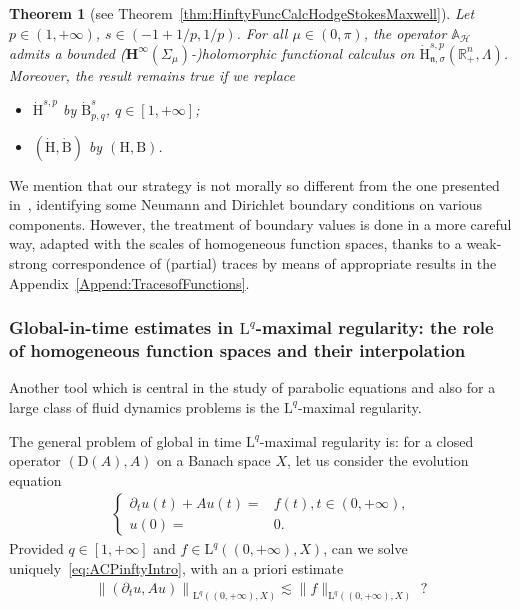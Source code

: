 \documentclass[10pt]{amsart}
\newtheorem{theo}{Theorem}[section]
\theoremstyle{definition}\newtheorem{defi}[theo]{Definition}\newtheorem{rema}[theo]{Remark}\newtheorem{exam}[theo]{Example}\newtheorem{exem}[theo]{Example}\newtheorem{nota}[theo]{Notation}
\newcommand{\bbA}{\mathbb{A}}
\newcommand{\bbR}{\mathbb{R}}
\newcommand{\rmH}{\mathrm{H}}%
\newcommand{\rmB}{\mathrm{B}}
\newcommand{\rmD}{\mathrm{D}}
\newcommand{\rmL}{\mathrm{L}}
\newcommand{\clH}{\mathcal{H}}
\newcommand{\bfH}{\mathbf{H}}
\newcommand{\fkn}{\mathfrak{n}}
\begin{document}
\begin{theo}[{see Theorem~\ref{thm:HinftyFuncCalcHodgeStokesMaxwell}}]\label{thm:HinftyFuncCalcHodgeStokesMaxwellIntro}
Let $p\in(1,+\infty)$, $s\in(-1+1/p,1/p)$. For all $\mu\in (0,\pi)$, the operator $\bbA_{\clH}$ admits a bounded ($\bfH^{\infty}(\Sigma_\mu)$-)holomorphic functional calculus on $\dot{\rmH}^{s,p}_{\fkn,\sigma}(\bbR^n_+,\Lambda)$.
Moreover, the result remains true if we replace
\begin{itemize}
\item $\dot{\rmH}^{s,p}$ by $\dot{\rmB}^{s}_{p,q}$, $q\in[1,+\infty]$;
\item $(\dot{\rmH},\dot{\rmB})$ by $({\rmH},{\rmB})$.
\end{itemize}
\end{theo}

We mention that our strategy is not morally so different from the one presented in~\cite[Beginning~of~Section~4]{GeissertHeckTrunk2013}, identifying some Neumann and Dirichlet boundary conditions on various components. However, the treatment of boundary values is done in a more careful way, adapted with the scales of homogeneous function spaces, thanks to a weak-strong correspondence of (partial) traces by means of appropriate results in the Appendix~\ref{Append:TracesofFunctions}.

\subsubsection{Global-in-time estimates in \texorpdfstring{$\rmL^q$}{Lq}-maximal regularity: the role of homogeneous function spaces and their interpolation}

Another tool which is central in the study of parabolic equations and also for a large class of fluid dynamics problems is the $\rmL^q$-maximal regularity.

The general problem of global in time $\rmL^q$-maximal regularity is: for a closed operator $(\rmD(A),A)$ on a Banach space $X$, let us consider the evolution equation
\begin{align}\label{eq:ACPinftyIntro}
\left\{
\begin{array}{rl}
\partial_t u(t) +Au(t) =& f(t), t\in(0,+\infty) \text{,}\\
u(0) =& 0.
\end{array}
\right.
\end{align}
Provided $q\in[1,+\infty]$ and $f\in\rmL^{q}((0,+\infty),X)$, can we solve uniquely~\eqref{eq:ACPinftyIntro}, with an a priori estimate
\begin{align}\label{ineq:estimateMaxRegIntro}
\left\| (\partial_t u, Au)\right\|_{\rmL^q\left((0,+\infty),X\right)} \lesssim \| f\|_{\rmL^q((0,+\infty),X)} \text{ ?}
\end{align}
\end{document}
